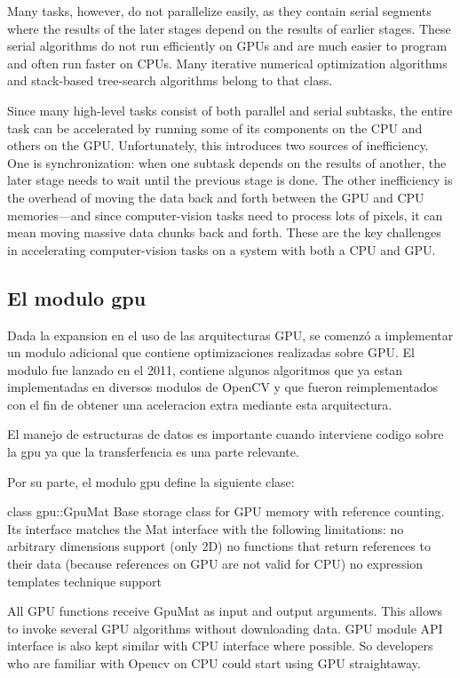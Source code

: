 \documentclass[a4paper,10pt]{report}
\begin{document}
Many tasks, however, do not parallelize easily, as they contain serial segments where the results of the later stages depend on the results of earlier stages. These serial algorithms do not run efficiently on GPUs and are much easier to program and often run faster on CPUs. Many iterative numerical optimization algorithms and stack-based tree-search algorithms belong to that class.

Since many high-level tasks consist of both parallel and serial subtasks, the entire task can be accelerated by running some of its components on the CPU and others on the GPU. Unfortunately, this introduces two sources of inefficiency. One is synchronization: when one subtask depends on the results of another, the later stage needs to wait until the previous stage is done. The other inefficiency is the overhead of moving the data back and forth between the GPU and CPU memories—and since computer-vision tasks need to process lots of pixels, it can mean moving massive data chunks back and forth. These are the key challenges in accelerating computer-vision tasks on a system with both a CPU and GPU.




\subsection{El modulo gpu}

Dada la expansion en el uso de las arquitecturas GPU, se comenzó a implementar un modulo adicional que contiene optimizaciones realizadas sobre GPU.
El modulo fue lanzado en el 2011, contiene algunos algoritmos que ya estan implementadas en diversos modulos de OpenCV y que fueron reimplementados con el fin de obtener una aceleracion extra mediante esta arquitectura.


El manejo de estructuras de datos es importante cuando interviene codigo sobre la gpu ya que la transferfencia es una parte relevante. 

Por su parte, el modulo gpu define la siguiente clase:

class gpu::GpuMat
Base storage class for GPU memory with reference counting. Its interface matches the Mat interface with the following limitations:
no arbitrary dimensions support (only 2D)
no functions that return references to their data (because references on GPU are not valid for CPU)
no expression templates technique support

All GPU functions receive GpuMat as input and output arguments. This allows to invoke several GPU algorithms without downloading data. GPU module API interface is also kept similar with CPU interface where possible. So developers who are familiar with Opencv on CPU could start using GPU straightaway.
\end{document}
